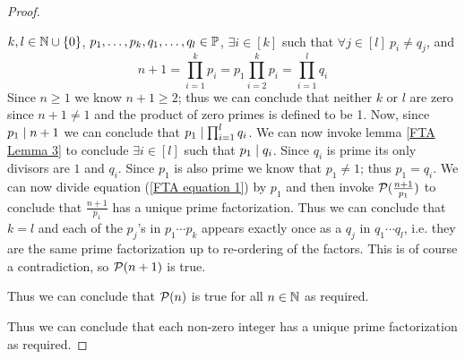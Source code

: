 \begin{proof}
\begin{enumerate}
\begin{itemize}
                            $k, l \in \mathbb{N} \cup \left\{0\right\}$, $p_1, \dots, p_k, q_1, \dots, q_l \in \mathbb{P}$,
                            $\exists i \in [k]$ such that $\forall j \in [l] \ p_i \neq q_j$, and
                            \begin{equation}
                                n + 1 = \prod_{i = 1}^{k} p_i = p_1 \prod_{i = 2}^{k} p_i = \prod_{i = 1}^{l} q_i
                                \label{FTA equation 1}
                            \end{equation}
                            Since $n \ge 1$ we know $n + 1 \ge 2$; thus we can conclude that neither
                            $k$ or $l$ are zero since $n + 1 \neq 1$ and the product of zero primes
                            is defined to be 1. Now, since $p_1 \mid n + 1$ we can conclude
                            that $p_1 \mid \prod_{i = 1}^{l} q_i$. We can now invoke lemma
                            \ref{FTA Lemma 3} to conclude $\exists i \in [l]$ such that $p_1 \mid q_i$.
                            Since $q_i$ is prime its only divisors are $1$ and $q_i$. Since $p_1$
                            is also prime we know that $p_1 \neq 1$; thus $p_1 = q_i$.
                            We can now divide equation (\ref{FTA equation 1}) by $p_1$ and then
                            invoke $\mathcal{P}(\frac{n + 1}{p_1})$ to conclude that $\frac{n + 1}{p_1}$
                            has a unique prime factorization. Thus
                            we can conclude that $k = l$ and each of the $p_j$'s in
                            $p_1 \cdots p_k$ appears exactly once as a $q_j$ in $q_1 \cdots q_l$,
                            i.e. they are the same prime factorization up to re-ordering of the factors.
                            This is of course a contradiction, so $\mathcal{P}(n + 1)$ is true.
                    \end{itemize}
                    Thus we can conclude that $\mathcal{P}(n)$ is true for all $n \in \mathbb{N}$
                    as required.
            \end{enumerate}
            Thus we can conclude that each non-zero integer has a unique prime
            factorization as required. \QED
        \end{proof}
